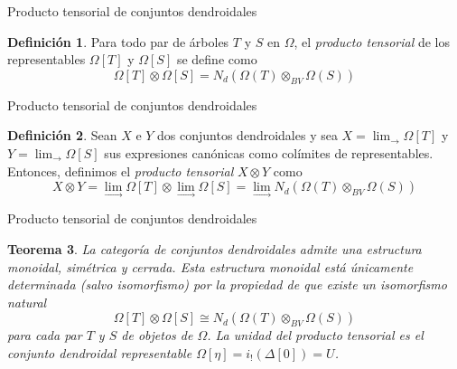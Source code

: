 \documentclass[12pt,aspectratio=169]{beamer}
\numberwithin{equation}{section}
\newtheorem{teo}{Teorema}[section]
\theoremstyle{definition}
\newtheorem{defi}[teo]{Definici\'on}
\begin{document}
\begin{frame}{Producto tensorial de conjuntos dendroidales}
    \begin{defi}
        Para todo par de \'arboles $T$ y $S$ en $\Omega$, el \emph{producto tensorial} de los representables $\Omega[T]$ y $\Omega[S]$ se define como
        $$
            \Omega[T]\otimes\Omega[S] = N_d(\Omega(T)\otimes_{BV}\Omega(S))
        $$
    
    \end{defi}
\end{frame}
\begin{frame}{Producto tensorial de conjuntos dendroidales}
    \begin{defi}
        Sean $X$ e $Y$ dos conjuntos dendroidales y sea $X = \lim_{\to}\Omega[T]$ y $Y = \lim_{\to}\Omega[S]$ sus expresiones can\'onicas como col\'imites de representables. Entonces, definimos el \emph{producto tensorial} $X\otimes Y$ como
        $$
            X\otimes Y = \lim_{\to}\Omega[T]\otimes\lim_{\to}\Omega[S] = \lim_{\to} N_d(\Omega(T)\otimes_{BV}\Omega(S))
        $$
    \end{defi}
\end{frame}
\begin{frame}{Producto tensorial de conjuntos dendroidales}
    \begin{teo}
        La categor\'ia de conjuntos dendroidales admite una estructura monoidal, sim\'etrica y cerrada. Esta estructura monoidal est\'a \'unicamente determinada (salvo isomorfismo) por la propiedad de que existe un isomorfismo natural
        $$
            \Omega[T]\otimes\Omega[S] \cong N_d(\Omega(T)\otimes_{BV}\Omega(S))
        $$
        para cada par $T$ y $S$ de objetos de $\Omega$. La unidad del producto tensorial es el conjunto dendroidal representable $\Omega[\eta]=i_!(\Delta[0]) = U$.
    \end{teo}
\end{frame}
\end{document}
